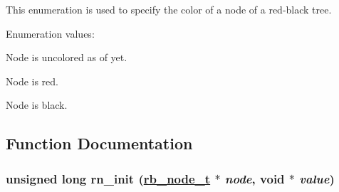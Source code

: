 This enumeration is used to specify the color of a node of a red-black tree. \begin{Desc}
\item[Enumeration values: ]\par
\begin{description}
\item[{\em 
\hypertarget{group__dbprim__rbtree_a38a138}{
{\em RB\_\-COLOR\_\-NONE}}
\label{group__dbprim__rbtree_a38a138}
}]Node is uncolored as of yet. \item[{\em 
\hypertarget{group__dbprim__rbtree_a38a139}{
{\em RB\_\-COLOR\_\-RED}}
\label{group__dbprim__rbtree_a38a139}
}]Node is red. \item[{\em 
\hypertarget{group__dbprim__rbtree_a38a140}{
{\em RB\_\-COLOR\_\-BLACK}}
\label{group__dbprim__rbtree_a38a140}
}]Node is black. \end{description}
\end{Desc}



\subsection{Function Documentation}
\hypertarget{group__dbprim__rbtree_a13}{
\subsubsection[rn\_\-init]{\setlength{\rightskip}{0pt plus 5cm}unsigned long rn\_\-init (\hyperlink{group__dbprim__rbtree_a1}{rb\_\-node\_\-t} $\ast$ {\em node}, void $\ast$ {\em value})}}
\label{group__dbprim__rbtree_a13}


